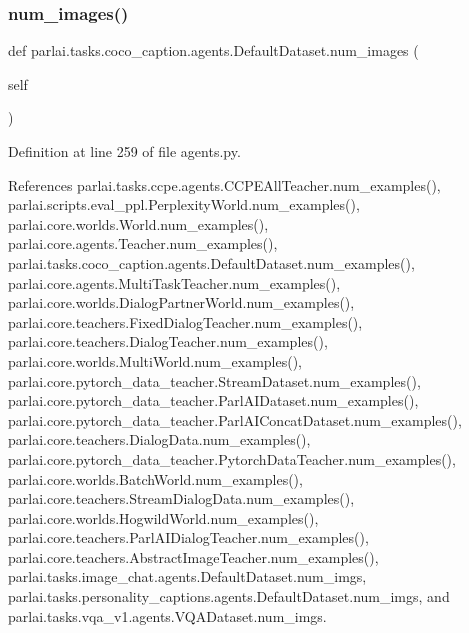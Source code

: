 \subsubsection{\texorpdfstring{num\+\_\+images()}{num\_images()}}
{\footnotesize\ttfamily def parlai.\+tasks.\+coco\+\_\+caption.\+agents.\+Default\+Dataset.\+num\+\_\+images (\begin{DoxyParamCaption}\item[{}]{self }\end{DoxyParamCaption})}



Definition at line 259 of file agents.\+py.



References parlai.\+tasks.\+ccpe.\+agents.\+C\+C\+P\+E\+All\+Teacher.\+num\+\_\+examples(), parlai.\+scripts.\+eval\+\_\+ppl.\+Perplexity\+World.\+num\+\_\+examples(), parlai.\+core.\+worlds.\+World.\+num\+\_\+examples(), parlai.\+core.\+agents.\+Teacher.\+num\+\_\+examples(), parlai.\+tasks.\+coco\+\_\+caption.\+agents.\+Default\+Dataset.\+num\+\_\+examples(), parlai.\+core.\+agents.\+Multi\+Task\+Teacher.\+num\+\_\+examples(), parlai.\+core.\+worlds.\+Dialog\+Partner\+World.\+num\+\_\+examples(), parlai.\+core.\+teachers.\+Fixed\+Dialog\+Teacher.\+num\+\_\+examples(), parlai.\+core.\+teachers.\+Dialog\+Teacher.\+num\+\_\+examples(), parlai.\+core.\+worlds.\+Multi\+World.\+num\+\_\+examples(), parlai.\+core.\+pytorch\+\_\+data\+\_\+teacher.\+Stream\+Dataset.\+num\+\_\+examples(), parlai.\+core.\+pytorch\+\_\+data\+\_\+teacher.\+Parl\+A\+I\+Dataset.\+num\+\_\+examples(), parlai.\+core.\+pytorch\+\_\+data\+\_\+teacher.\+Parl\+A\+I\+Concat\+Dataset.\+num\+\_\+examples(), parlai.\+core.\+teachers.\+Dialog\+Data.\+num\+\_\+examples(), parlai.\+core.\+pytorch\+\_\+data\+\_\+teacher.\+Pytorch\+Data\+Teacher.\+num\+\_\+examples(), parlai.\+core.\+worlds.\+Batch\+World.\+num\+\_\+examples(), parlai.\+core.\+teachers.\+Stream\+Dialog\+Data.\+num\+\_\+examples(), parlai.\+core.\+worlds.\+Hogwild\+World.\+num\+\_\+examples(), parlai.\+core.\+teachers.\+Parl\+A\+I\+Dialog\+Teacher.\+num\+\_\+examples(), parlai.\+core.\+teachers.\+Abstract\+Image\+Teacher.\+num\+\_\+examples(), parlai.\+tasks.\+image\+\_\+chat.\+agents.\+Default\+Dataset.\+num\+\_\+imgs, parlai.\+tasks.\+personality\+\_\+captions.\+agents.\+Default\+Dataset.\+num\+\_\+imgs, and parlai.\+tasks.\+vqa\+\_\+v1.\+agents.\+V\+Q\+A\+Dataset.\+num\+\_\+imgs.

